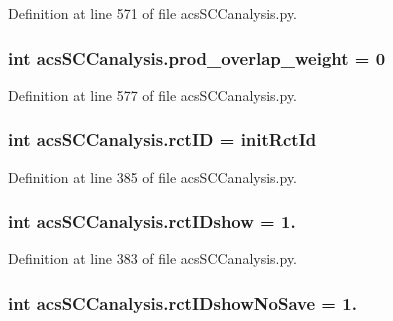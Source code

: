 Definition at line 571 of file acs\-S\-C\-Canalysis.\-py.

\hypertarget{a00102_ab78b07d6cd1a94356c4fee43dfc1272a}{
\subsubsection[{prod\-\_\-overlap\-\_\-weight}]{\setlength{\rightskip}{0pt plus 5cm}int acs\-S\-C\-Canalysis.\-prod\-\_\-overlap\-\_\-weight = 0}}\label{a00102_ab78b07d6cd1a94356c4fee43dfc1272a}


Definition at line 577 of file acs\-S\-C\-Canalysis.\-py.

\hypertarget{a00102_a78ffc7d3b69c53ec5389a151e7fdcb83}{
\subsubsection[{rct\-I\-D}]{\setlength{\rightskip}{0pt plus 5cm}int acs\-S\-C\-Canalysis.\-rct\-I\-D = {\bf init\-Rct\-Id}}}\label{a00102_a78ffc7d3b69c53ec5389a151e7fdcb83}


Definition at line 385 of file acs\-S\-C\-Canalysis.\-py.

\hypertarget{a00102_a8a780c7762bc8a40f296abfd474b7ce4}{
\subsubsection[{rct\-I\-Dshow}]{\setlength{\rightskip}{0pt plus 5cm}int acs\-S\-C\-Canalysis.\-rct\-I\-Dshow = 1.}}\label{a00102_a8a780c7762bc8a40f296abfd474b7ce4}


Definition at line 383 of file acs\-S\-C\-Canalysis.\-py.

\hypertarget{a00102_a3942b0b71d5893c244f7f49929db336b}{
\subsubsection[{rct\-I\-Dshow\-No\-Save}]{\setlength{\rightskip}{0pt plus 5cm}int acs\-S\-C\-Canalysis.\-rct\-I\-Dshow\-No\-Save = 1.}}\label{a00102_a3942b0b71d5893c244f7f49929db336b}


